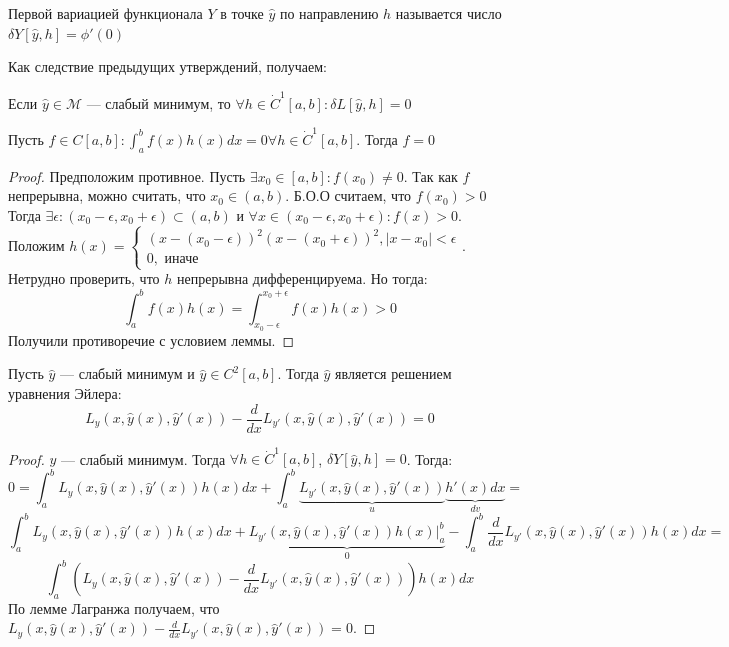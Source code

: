 \begin{definition}
    Первой вариацией функционала \(Y\) в точке \(\hat{y}\) по направлению \(h\) называется число \(\delta Y[\hat{y}, h] = \phi'(0)\)
\end{definition}

Как следствие предыдущих утверждений, получаем:
\begin{theorem}
    Если \(\hat{y} \in \mathcal{M}\) --- слабый минимум, то \(\forall h \in \dot{C}^1[a, b]: \delta L[\hat{y}, h] = 0\)
\end{theorem}

\begin{lemma}[Лагранж]
    Пусть \(f \in C[a, b]: \int_a^b f(x)h(x)dx = 0 \forall h \in \dot{C}^1[a, b]\). Тогда \(f = 0\)
\end{lemma}
\begin{proof}
    Предположим противное. Пусть \(\exists x_0 \in [a, b]: f(x_0) \ne 0\). Так как \(f\) непрерывна, можно считать, что \(x_0 \in (a, b)\). Б.О.О считаем, что \(f(x_0) > 0\) Тогда \(\exists \epsilon: (x_0 - \epsilon, x_0 + \epsilon) \subset (a, b)\) и \(\forall x \in (x_0 - \epsilon, x_0 + \epsilon):  f(x) > 0\). Положим \(h(x) = \left\{\begin{array}{l}
        (x - (x_0 - \epsilon))^2(x - (x_0 + \epsilon))^2, |x - x_0| < \epsilon \\
        0, \text{ иначе}
    \end{array}\right.\). Нетрудно проверить, что \(h\) непрерывна дифференцируема. Но тогда:
    \[\int_a^b f(x)h(x) = \int_{x_0 - \epsilon}^{x_0 + \epsilon} f(x)h(x) > 0\]
    Получили противоречие с условием леммы.
\end{proof}

\begin{theorem}
    Пусть \(\hat{y}\) --- слабый минимум и \(\hat{y} \in C^2[a, b]\). Тогда \(\hat{y}\) является решением уравнения Эйлера:
    \[L_y(x, \hat{y}(x), \hat{y}'(x)) - \frac{d}{dx}L_{y'}(x, \hat{y}(x), \hat{y}'(x)) = 0\]
\end{theorem}
\begin{proof}
    \(\hat{y}\) --- слабый минимум. Тогда \(\forall h \in \dot{C}^1[a, b]\), \(\delta Y[\hat{y}, h] = 0\). Тогда:
    \[0 = \int_a^b L_y(x, \hat{y}(x), \hat{y}'(x))h(x)dx + \int_a^b \underbrace{L_{y'}(x, \hat{y}(x), \hat{y}'(x))}_u\underbrace{h'(x) dx}_{dv} = \]
    \[\int_a^b L_y(x, \hat{y}(x), \hat{y}'(x))h(x)dx + \underbrace{L_{y'}(x, \hat{y}(x), \hat{y}'(x))h(x)\bigg|_a^b}_0 - \int_a^b \frac{d}{dx}L_{y'}(x, \hat{y}(x), \hat{y}'(x))h(x)dx = \]
    \[\int_a^b \left( L_y(x, \hat{y}(x), \hat{y}'(x)) - \frac{d}{dx}L_{y'}(x, \hat{y}(x), \hat{y}'(x)) \right)h(x) dx\]
    По лемме Лагранжа получаем, что \(L_y(x, \hat{y}(x), \hat{y}'(x)) - \frac{d}{dx}L_{y'}(x, \hat{y}(x), \hat{y}'(x)) = 0\).
\end{proof}

